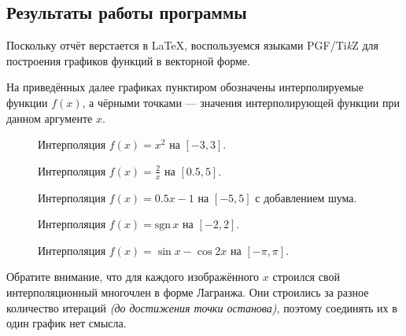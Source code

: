 \subsection{Результаты работы программы}

Поскольку отчёт верстается в \LaTeX, воспользуемся языками PGF/Ti\textit{k}Z для построения графиков функций в векторной форме.

На приведённых далее графиках пунктиром обозначены интерполируемые функции \( f(x) \), а чёрными точками --- значения интерполирующей функции при данном аргументе \( x \).

\begin{figure}[H]
  \centering
  
  \caption{Интерполяция \( f(x)=x^2 \) на \( [-3,3] \).}
\end{figure}

\begin{figure}[H]
  \centering
  
  \caption{Интерполяция \( f(x)=\frac{2}{x} \) на \( [0.5,5] \).}
\end{figure}

\begin{figure}[H]
  \centering
  
  \caption{Интерполяция \( f(x)=0.5x-1 \) на \( [-5,5] \) с добавлением шума.}
\end{figure}

\begin{figure}[H]
  \centering
  
  \caption{Интерполяция \( f(x)=\mathrm{sgn}\,x \) на \( [-2,2] \).}
  \label{fig:sgn}
\end{figure}

\begin{figure}[H]
  \centering
  
  \caption{Интерполяция \( f(x)=\sin x-\cos 2x \) на \( [-\pi,\pi] \).}
  \label{fig:not_enough_points}
\end{figure}

Обратите внимание, что для каждого изображённого \( x \) строился свой интерполяционный многочлен в форме Лагранжа. Они строились за разное количество итераций \textit{(до достижения точки останова)}, поэтому соединять их в один график нет смысла.